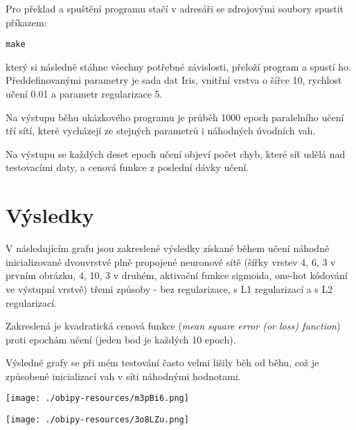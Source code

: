 \documentclass[titlepage]{article}
\begin{document}
Pro překlad a spuštění programu stačí v adresáři se zdrojovými soubory spustit
příkazem:

\begin{verbatim}
make
\end{verbatim}

který si následně stáhne všechny potřebné závislosti, přeloží program a spustí
ho. Předdefinovanými parametry je sada dat Iris, vnitřní vrstva o šířce 10,
rychlost učení 0.01 a parametr regularizace 5.

Na výstupu běhu ukázkového programu je průběh 1000 epoch paralelního učení tří
sítí, které vycházejí ze stejných parametrů i náhodných úvodních vah.

Na výstupu se každých deset epoch učení objeví počet chyb, které síť udělá nad
testovacími daty, a cenová funkce z poslední dávky učení.

\newpage
\section{Výsledky}
\label{sec:org66526aa}

V následujícím grafu jsou zakreslené výsledky získané během učení náhodně
inicializované dvouvrstvé plně propojené neuronové sítě (šířky vrstev 4, 6, 3 v
prvním obrázku, 4, 10, 3 v druhém, aktivační funkce sigmoida, one-hot kódování
ve výstupní vrstvě) třemi způsoby - bez regularizace, s L1 regularizací a s L2
regularizací.

Zakreslená je kvadratická cenová funkce (\emph{mean square error (or loss) function})
proti epochám učení (jeden bod je každých 10 epoch).

Výsledné grafy se při mém testování často velmi lišily běh od běhu, což je
způsobené inicializací vah v síti náhodnými hodnotami.

\begin{center}
\texttt{[image: ./obipy-resources/m3pBi6.png]}
\end{center}

\begin{center}
\texttt{[image: ./obipy-resources/3o8LZu.png]}
\end{center}
\end{document}
